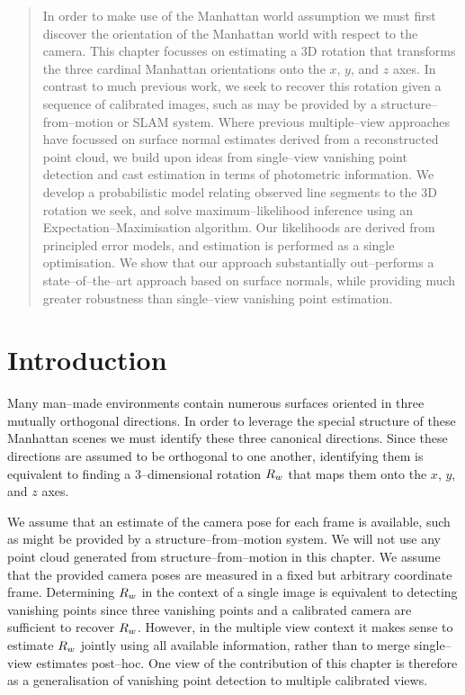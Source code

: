 \begin{quote}
  In order to make use of the Manhattan world assumption we must first
  discover the orientation of the Manhattan world with respect to the
  camera. This chapter focusses on estimating a 3D rotation that
  transforms the three cardinal Manhattan orientations onto the $x$,
  $y$, and $z$ axes. In contrast to much previous work, we seek to
  recover this rotation given a sequence of calibrated images, such as
  may be provided by a structure--from--motion or SLAM system. Where
  previous multiple--view approaches have focussed on surface normal
  estimates derived from a reconstructed point cloud, we build upon
  ideas from single--view vanishing point detection and cast
  estimation in terms of photometric information. We develop a
  probabilistic model relating observed line segments to the 3D
  rotation we seek, and solve maximum--likelihood inference using an
  Expectation--Maximisation algorithm. Our likelihoods are derived
  from principled error models, and estimation is performed as a
  single optimisation.  We show that our approach substantially
  out--performs a state--of--the--art approach based on surface
  normals, while providing much greater robustness than single--view
  vanishing point estimation.\footnotemark
\end{quote}


\section{Introduction}

Many man--made environments contain numerous surfaces oriented in
three mutually orthogonal directions. In order to leverage the special
structure of these Manhattan scenes we must identify these three
canonical directions. Since these directions are assumed to be
orthogonal to one another, identifying them is equivalent to finding a
3--dimensional rotation $\SceneR$ that maps them onto the $x$, $y$,
and $z$ axes.

We assume that an estimate of the camera pose for each frame is
available, such as might be provided by a structure--from--motion
system. We will not use any point cloud generated from
structure--from--motion in this chapter. We assume that the provided
camera poses are measured in a fixed but arbitrary coordinate
frame. Determining $\SceneR$ in the context of a single
image is equivalent to detecting vanishing points since three
vanishing points and a calibrated camera are sufficient to recover
$\SceneR$. However, in the multiple view context it makes sense to
estimate $\SceneR$ jointly using all available information, rather
than to merge single--view estimates post--hoc. One view of the
contribution of this chapter is therefore as a generalisation of
vanishing point detection to multiple calibrated views.

